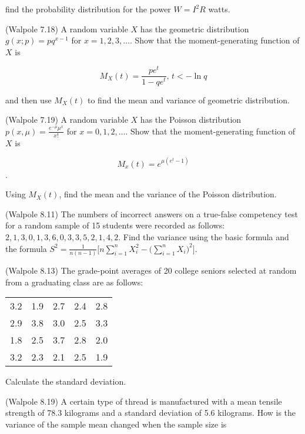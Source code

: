 \documentclass[14pt]{exam}
\begin{document}
\begin{questions}
		find the probability distribution for the power $W = I^2R$ watts.
		
		\question
		(Walpole 7.18)
		A random variable $X$ has the geometric distribution $g(x; p) = pq^{x-1}$ for $x = 1, 2, 3, \dots$. Show that the moment-generating function of $X$ is
		
		$$
			M_X(t) = \frac{pe^t}{1 - qe^t},\,t < -\ln q
		$$
		
		and then use $M_X(t)$ to find the mean and variance of geometric distribution.
		
		\question
		(Walpole 7.19)
		A random variable $X$ has the Poisson distribution $p(x, \mu) = \frac{e^{-\mu}\mu^x}{x!}$ for $x = 0, 1, 2, \dots$. Show that the moment-generating function of $X$ is
		
		$$
			M_x(t) = e^{\mu(e^t - 1)}
		$$.
		
		Using $M_X(t)$, find the mean and the variance of the Poisson distribution.
		
		\question
		(Walpole 8.11) The numbers of incorrect answers on a true-false competency test for a random sample of 15 students were recorded as follows: $2, 1, 3, 0, 1, 3, 6, 0, 3, 3, 5, 2, 1, 4, 2$. Find the variance using the basic formula and the formula $S^2 = \frac{1}{n(n-1)} \biggr[n\sum_{i=1}^n X_i^2 - \bigr(\sum_{i=1}^n X_i\bigr)^2\biggr]$.
		
		
		\question
		(Walpole 8.13)
		The grade-point averages of 20 college seniors selected at random from a graduating class are as follows:
		\begin{table}[H]
			\centering
			\begin{tabular}{ccccc}
				3.2 & 1.9 & 2.7 & 2.4 & 2.8\\
				2.9 & 3.8 & 3.0 & 2.5 & 3.3\\
				1.8 & 2.5 & 3.7 & 2.8 & 2.0\\
				3.2 & 2.3 & 2.1 & 2.5 & 1.9\\
			\end{tabular}
		\end{table}
		Calculate the standard deviation.
		
		\question
		(Walpole 8.19)
		A certain type of thread is manufactured with a mean tensile strength of 78.3 kilograms and a standard deviation of 5.6 kilograms. How is the variance of the sample mean changed when the sample size is
\end{questions}
\end{document}
